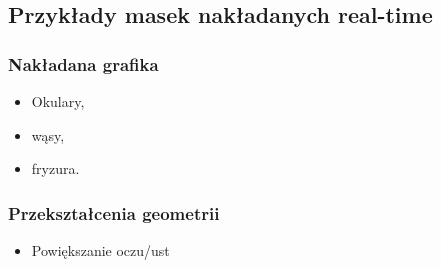 \subsection{Przykłady masek nakładanych real-time}
\subsubsection{Nakładana grafika}
\begin{itemize}
    \item Okulary,
    \item wąsy,
    \item fryzura.
\end{itemize}
\subsubsection{Przekształcenia geometrii}
\begin{itemize}
    \item Powiększanie oczu/ust
\end{itemize}
